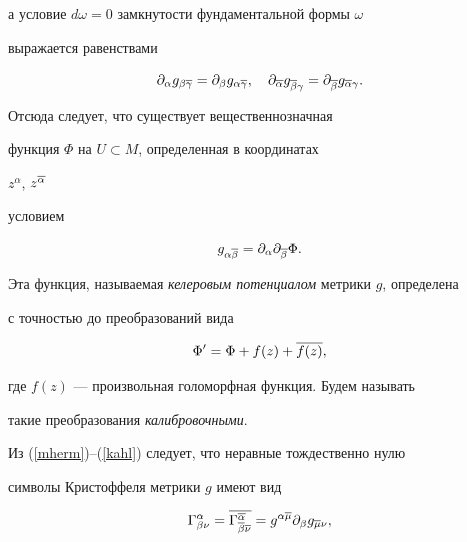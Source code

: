 а условие $d\omega=0$ замкнутости фундаментальной формы $\omega$


выражается равенствами


\begin{equation}


\label{zamkn}


\partial_\alpha g_{\beta\ol\gamma}=\partial_\beta g_{\alpha\ol\gamma},


\quad


\pl{\ol\alpha} g_{\ol\beta\gamma} = \pl{\ol\beta}g_{\ol\alpha\gamma}.


\end{equation}


Отсюда следует, что существует вещественнозначная


функция $\Phi$ на $U \subset M$, определенная в координатах


$z^\alpha$, $z^{\overline\alpha}$


условием


\begin{equation}


\label{kahl}


g_{\alpha\ol\beta}=\partial_{\alpha}\partial_{\ol\beta}\Phi.


\end{equation}


Эта функция, называемая {\it келеровым потенциалом} метрики $g$, определена


с точностью до преобразований вида


\begin{equation}


\label{gau}


\Phi' = \Phi +f(z) +\ol{f(z)},


\end{equation}


где $f(z)$ --- произвольная голоморфная функция. Будем называть


такие преобразования {\it калибровочными}.





Из (\ref{mherm})--(\ref{kahl}) следует, что неравные тождественно нулю


символы Кристоффеля метрики $g$ имеют вид


\begin{equation}


\label{cris}


\Gamma^\alpha_{\beta\nu}= \ol{\Gamma^{\ol\alpha}_{\ol\beta


\ol\nu}}= g^{\alpha\ol\mu}\partial_\beta g_{\ol\mu\nu},


\end{equation}



